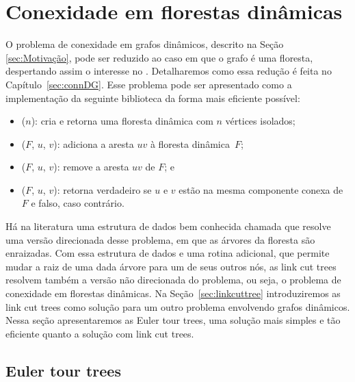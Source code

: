 \chapter{Conexidade em florestas dinâmicas}
\label{sec:connDF}

O problema de conexidade em grafos dinâmicos, descrito na Seção \ref{sec:Motivação}, pode ser reduzido ao caso em que o grafo é uma floresta, despertando assim o interesse no . Detalharemos como essa redução é feita no Capítulo~\ref{sec:connDG}. Esse problema pode ser apresentado como a implementação da seguinte biblioteca da forma mais eficiente possível: 

\begin{itemize}
\item \dymForestCreate($n$): cria e retorna uma floresta dinâmica com $n$ vértices isolados;
\item \dymForestAddEdge($F$, $u$, $v$): adiciona a aresta $uv$ à floresta dinâmica~$F$;
\item \dymForestDelEdge($F$, $u$, $v$): remove a aresta $uv$ de $F$; e
\item \dymForestQuery($F$, $u$, $v$): retorna verdadeiro se $u$ e $v$ estão na mesma componente conexa de $F$ e falso, caso contrário.
\end{itemize}
 
Há na literatura uma estrutura de dados bem conhecida chamada  \cite{SleatroTarjanLinkCutTree1983} que resolve uma versão direcionada desse problema, em que as árvores da floresta são enraizadas.
Com essa estrutura de dados e uma rotina adicional, que permite mudar a raiz de uma dada árvore para um de seus outros nós, as link cut trees resolvem também a versão não direcionada do problema, ou seja, o problema de conexidade em florestas dinâmicas.
Na Seção~\ref{sec:linkcuttree} introduziremos as link cut trees como solução para um outro problema envolvendo grafos dinâmicos.
Nessa seção apresentaremos as Euler tour trees, uma solução mais simples e tão eficiente quanto a solução com link cut trees.


\section{Euler tour trees} 

